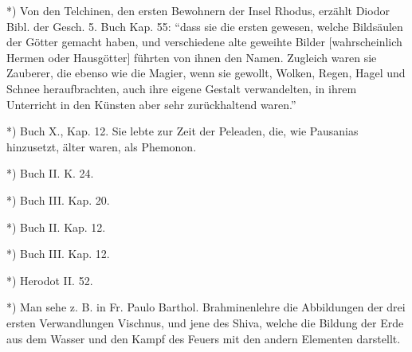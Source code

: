 \documentclass[a4paper, 11pt, oneside, polutonikogreek, german]{article}
\begin{document}
*) Von den Telchinen, den ersten Bewohnern der Insel Rhodus, erzählt Diodor Bibl. der Gesch. 5. Buch Kap. 55: "`dass sie die ersten gewesen, welche Bildsäulen der Götter gemacht haben, und verschiedene alte geweihte Bilder [wahrscheinlich Hermen oder Hausgötter] führten von ihnen den Namen. Zugleich waren sie Zauberer, die ebenso wie die Magier, wenn sie gewollt, Wolken, Regen, Hagel und Schnee heraufbrachten, auch ihre eigene Gestalt verwandelten, in ihrem Unterricht in den Künsten aber sehr zurückhaltend waren."'

*) Buch X., Kap. 12. Sie lebte zur Zeit der Peleaden, die, wie Pausanias hinzusetzt, älter waren, als Phemonon.

*) Buch II. K. 24.

*) Buch III. Kap. 20.

*) Buch II. Kap. 12.

*) Buch III. Kap. 12.

*) Herodot II. 52.

*) Man sehe z. B. in Fr. Paulo Barthol. Brahminenlehre die Abbildungen der drei ersten Verwandlungen Vischnus, und jene des Shiva, welche die Bildung der Erde aus dem Wasser und den Kampf des Feuers mit den andern Elementen darstellt.
\end{document}
